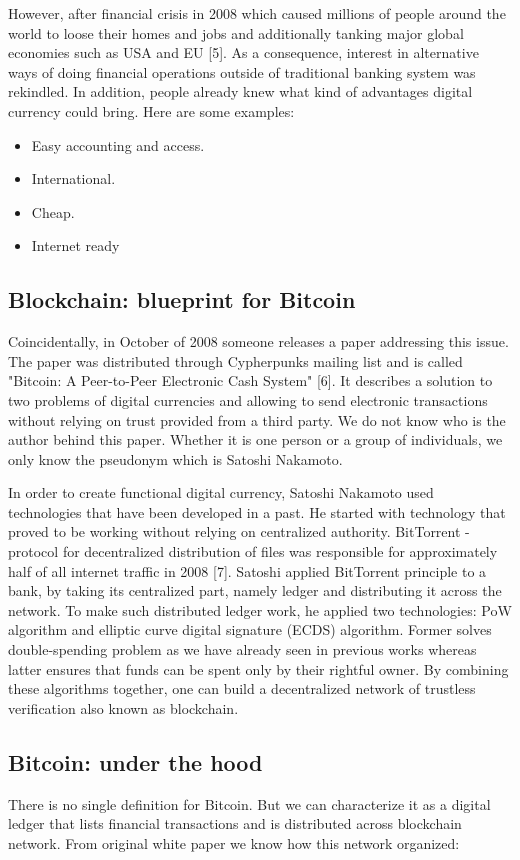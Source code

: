 \documentclass[conference,compsoc]{IEEEtran}
\begin{document}
However, after financial crisis in 2008 which caused millions of people around the world to loose their homes and jobs and additionally tanking major global economies such as USA and EU [5].
As a consequence, interest in alternative ways of doing financial operations outside of traditional banking system was rekindled. 
In addition, people already knew what kind of advantages digital currency could bring. Here are some examples:
\begin{itemize}
  \item Easy accounting and access. 
  \item International. 
  \item Cheap. 
  \item Internet ready
\end{itemize}

\subsection{Blockchain: blueprint for Bitcoin}
Coincidentally, in October of 2008 someone releases a paper addressing this issue. 
The paper was distributed through Cypherpunks mailing list and is called "Bitcoin: A Peer-to-Peer Electronic Cash System" [6]. 
It describes a solution to two problems of digital currencies and allowing to send electronic transactions without relying on trust provided from a third party. 
We do not know who is the author behind this paper. 
Whether it is one person or a group of individuals, we only know the pseudonym which is Satoshi Nakamoto.    

In order to create functional digital currency, Satoshi Nakamoto used technologies that have been developed in a past. 
He started with technology that proved to be working without relying on centralized authority.    
BitTorrent - protocol for decentralized distribution of files was responsible for approximately half of all internet traffic in 2008 [7]. 
Satoshi applied BitTorrent principle to a bank, by taking its centralized part, namely ledger and distributing it across the network. 
To make such distributed ledger work, he applied two technologies: PoW algorithm and elliptic curve digital signature (ECDS) algorithm.
Former solves double-spending problem as we have already seen in previous works whereas latter ensures that funds can be spent only by their rightful owner.
By combining these algorithms together, one can build a decentralized network of trustless verification also known as blockchain. 

\subsection{Bitcoin: under the hood}
There is no single definition for Bitcoin.
But we can characterize it as a digital ledger that lists financial transactions and is distributed across blockchain network. 
From original white paper we know how this network organized: 
\end{document}
